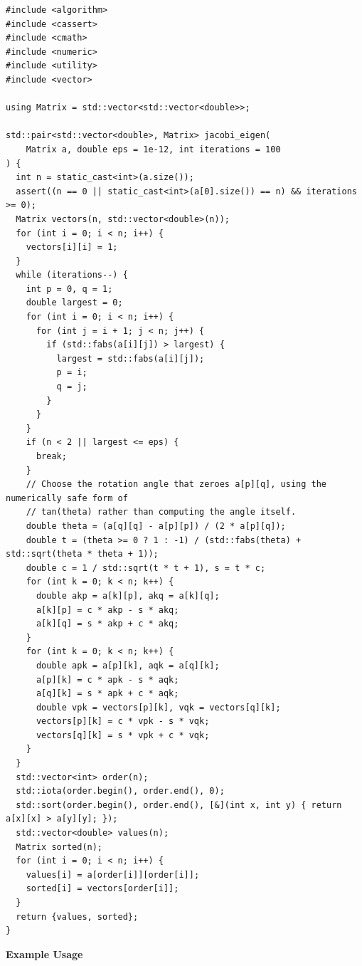 \begin{lstlisting}[style=cpp]
#include <algorithm>
#include <cassert>
#include <cmath>
#include <numeric>
#include <utility>
#include <vector>

using Matrix = std::vector<std::vector<double>>;

std::pair<std::vector<double>, Matrix> jacobi_eigen(
    Matrix a, double eps = 1e-12, int iterations = 100
) {
  int n = static_cast<int>(a.size());
  assert((n == 0 || static_cast<int>(a[0].size()) == n) && iterations >= 0);
  Matrix vectors(n, std::vector<double>(n));
  for (int i = 0; i < n; i++) {
    vectors[i][i] = 1;
  }
  while (iterations--) {
    int p = 0, q = 1;
    double largest = 0;
    for (int i = 0; i < n; i++) {
      for (int j = i + 1; j < n; j++) {
        if (std::fabs(a[i][j]) > largest) {
          largest = std::fabs(a[i][j]);
          p = i;
          q = j;
        }
      }
    }
    if (n < 2 || largest <= eps) {
      break;
    }
    // Choose the rotation angle that zeroes a[p][q], using the numerically safe form of
    // tan(theta) rather than computing the angle itself.
    double theta = (a[q][q] - a[p][p]) / (2 * a[p][q]);
    double t = (theta >= 0 ? 1 : -1) / (std::fabs(theta) + std::sqrt(theta * theta + 1));
    double c = 1 / std::sqrt(t * t + 1), s = t * c;
    for (int k = 0; k < n; k++) {
      double akp = a[k][p], akq = a[k][q];
      a[k][p] = c * akp - s * akq;
      a[k][q] = s * akp + c * akq;
    }
    for (int k = 0; k < n; k++) {
      double apk = a[p][k], aqk = a[q][k];
      a[p][k] = c * apk - s * aqk;
      a[q][k] = s * apk + c * aqk;
      double vpk = vectors[p][k], vqk = vectors[q][k];
      vectors[p][k] = c * vpk - s * vqk;
      vectors[q][k] = s * vpk + c * vqk;
    }
  }
  std::vector<int> order(n);
  std::iota(order.begin(), order.end(), 0);
  std::sort(order.begin(), order.end(), [&](int x, int y) { return a[x][x] > a[y][y]; });
  std::vector<double> values(n);
  Matrix sorted(n);
  for (int i = 0; i < n; i++) {
    values[i] = a[order[i]][order[i]];
    sorted[i] = vectors[order[i]];
  }
  return {values, sorted};
}
\end{lstlisting}
\textbf{Example Usage}\par
